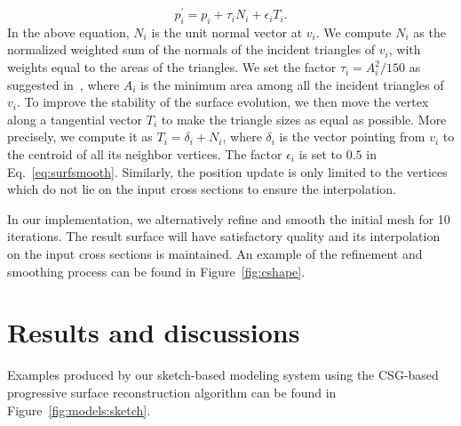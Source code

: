 \begin{equation}
\label{eq:surfsmooth}
    p^\prime_i = p_i + \tau_i N_i + \epsilon_i T_i.
\end{equation}
In the above equation, $N_i$ is the unit normal vector at $v_i$. We compute $N_i$
as the normalized weighted sum of the normals of the incident triangles of $v_i$,
with weights equal to the areas of the triangles. We set the factor
$\tau_i = A_i^2/150$ as suggested in~\cite{YB02}, where $A_i$ is the minimum area
among all the incident triangles of $v_i$. To improve the stability of the surface
evolution, we then move the vertex along a tangential vector $T_i$ to make
the triangle sizes as equal as possible. More precisely, we compute it
as $T_i = \delta_i + N_i$, where $\delta_i$ is the vector pointing from $v_i$
to the centroid of all its neighbor vertices. The factor $\epsilon_i$
is set to $0.5$ in Eq.~\ref{eq:surfsmooth}. Similarly, the position update is only
limited to the vertices which do not lie on the input cross sections
to ensure the interpolation.



In our implementation, we alternatively refine and smooth the initial mesh for 10 iterations. The result surface will have satisfactory quality and its interpolation on the input cross sections is maintained. An example of the
refinement and smoothing process can be found in Figure~\ref{fig:cshape}.


\section{Results and discussions}
\label{ch4:sec:disc}

Examples produced by our sketch-based modeling  system using the
CSG-based progressive surface reconstruction algorithm can be found
in Figure~\ref{fig:models:sketch}.

